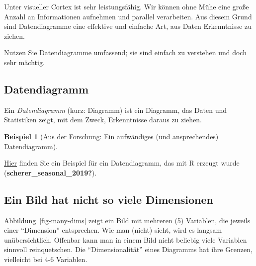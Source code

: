 \documentclass[
  a4paper,
  DIV=11]{scrreprt}
\theoremstyle{definition}
\theoremstyle{definition}
\newtheorem{example}{Beispiel}[chapter]
\theoremstyle{definition}
\theoremstyle{remark}
\begin{document}
Unter visueller Cortex ist sehr leistungsfähig. Wir können ohne Mühe
eine große Anzahl an Informationen aufnehmen und parallel verarbeiten.
Aus diesem Grund sind Datendiagramme eine effektive und einfache Art,
aus Daten Erkenntnisse zu ziehen.

\begin{tcolorbox}[enhanced jigsaw, leftrule=.75mm, opacitybacktitle=0.6, colback=white, colframe=quarto-callout-tip-color-frame, coltitle=black, colbacktitle=quarto-callout-tip-color!10!white, opacityback=0, left=2mm, breakable, titlerule=0mm, toptitle=1mm, bottomtitle=1mm, rightrule=.15mm, title=\textcolor{quarto-callout-tip-color}{\faLightbulb}\hspace{0.5em}{Tipp}, arc=.35mm, bottomrule=.15mm, toprule=.15mm]

Nutzen Sie Datendiagramme umfassend; sie sind einfach zu verstehen und
doch sehr mächtig.

\end{tcolorbox}

\subsection{Datendiagramm}\label{datendiagramm}

Ein \emph{Datendiagramm} (kurz: Diagramm) ist ein Diagramm, das Daten
und Statistiken zeigt, mit dem Zweck, Erkenntnisse daraus zu ziehen.

\begin{example}[Aus der Forschung: Ein aufwändiges (und ansprechendes)
Datendiagramm]\protect\hypertarget{exm-datendiagramm}{}\label{exm-datendiagramm}

\href{https://besjournals.onlinelibrary.wiley.com/cms/asset/22fa2646-002f-4890-800d-2717cc12bce8/jane13070-fig-0002-m.jpg}{Hier}
finden Sie ein Beispiel für ein Datendiagramm, das mit R erzeugt wurde
(\textbf{scherer\_seasonal\_2019?}).

\end{example}

\subsection{Ein Bild hat nicht so viele
Dimensionen}\label{ein-bild-hat-nicht-so-viele-dimensionen}

Abbildung~\ref{fig-many-dims} zeigt ein Bild mit mehreren (5) Variablen,
die jeweils einer ``Dimension'' entsprechen. Wie man (nicht) sieht, wird
es langsam unübersichtlich. Offenbar kann man in einem Bild nicht
beliebig viele Variablen sinnvoll reinquetschen. Die ``Dimensionalität''
eines Diagramms hat ihre Grenzen, vielleicht bei 4-6 Variablen.
\end{document}
